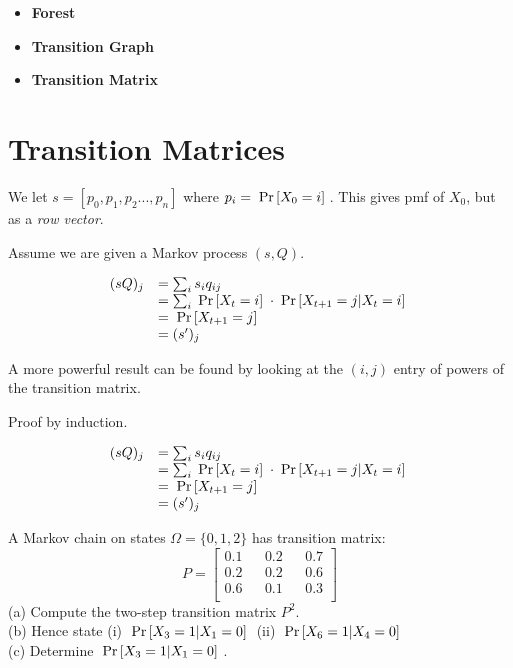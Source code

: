 \begin{itemize}
\item \textbf{Forest}
\item \textbf{Transition Graph}
\item \textbf{Transition Matrix}  
\end{itemize}


\section{Transition Matrices}

We let $s = [p_0, p_1, p_2 ..., p_n]$ where $p_i = \;\text{Pr}\left[X_0 = i\right]\;$. 
This gives pmf of $X_0$, but as a \textit{row vector}.  

Assume we are given a Markov process $(s,Q)$. 


\[
\begin{array}{ll}
(sQ)_j &= \sum_i s_i q_{ij}\\
&= \sum_i \;\text{Pr}\left[X_t = i\right]\; \cdot \;\text{Pr}\left[X_{t+1} = j | X_t = i\right]\; \\
&= \;\text{Pr}\left[X_{t+1} = j\right]\; \\
&= (s')_j \\
\end{array}
\]


A more powerful result can be found by looking at the $(i,j)$ entry 
of powers of the transition matrix. 

Proof by induction.

\[
\begin{array}{ll}
(sQ)_j &= \sum_i s_i q_{ij}\\
&= \sum_i \;\text{Pr}\left[X_t = i\right]\; \cdot \;\text{Pr}\left[X_{t+1} = j | X_t = i\right]\; \\
&= \;\text{Pr}\left[X_{t+1} = j\right]\; \\
&= (s')_j \\
\end{array}
\]

\frmrule

\begin{example}
A Markov chain on states $\Omega = \{0,1,2\}$ has transition matrix:
$$ P = 
\begin{bmatrix} 
0.1 && 0.2 && 0.7 \\ 
0.2 && 0.2 && 0.6 \\
0.6 && 0.1 && 0.3 \\
\end{bmatrix}
$$
(a) Compute the two-step transition matrix $P^2$. \\
(b) Hence state (i) $\;\text{Pr}\left[X_3 = 1 | X_1 = 0\right]\;$ (ii) $\;\text{Pr}\left[X_6 = 1 | X_4 = 0\right]\;$ \\
(c) Determine $\;\text{Pr}\left[X_3 = 1 | X_1 = 0\right]\;$. 
\end{example}


